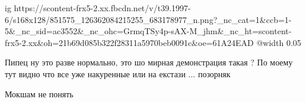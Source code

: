  
 
 
 
 

\ifcmt
  ig https://scontent-frx5-2.xx.fbcdn.net/v/t39.1997-6/s168x128/851575_126362084215255_683178977_n.png?_nc_cat=1&ccb=1-5&_nc_sid=ac3552&_nc_ohc=GrmqTSy4p-sAX-M_jhm&_nc_ht=scontent-frx5-2.xx&oh=21b69d085b322f28311a5970beb0091c&oe=61A24EAD
  @width 0.05
\fi


Пипец ну это разве нормально, это шо мирная демонстрация такая ? По моему тут
видно что все уже накуренные или на екстази ... позорняк

Мокшам не понять
